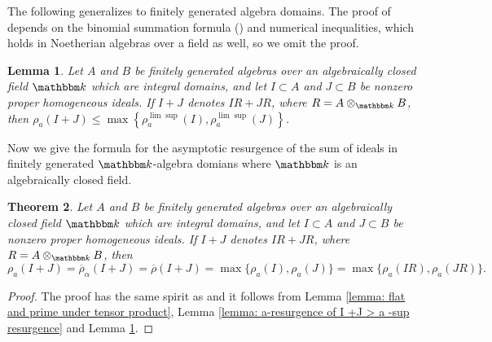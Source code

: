 \documentclass[12pt]{amsart}
\numberwithin{equation}{section}
\newtheorem{theorem}{Theorem}[section]
\newtheorem{lemma}[theorem]{Lemma}
\theoremstyle{definition}
\newcommand{\kk}{{\mathbbm k}}
\begin{document}
The following generalizes \cite[Lemma 2.5]{fiberprojective} to finitely generated algebra domains.  The proof of  \cite[Lemma 2.5]{fiberprojective} depends on the binomial summation formula (\cite[Theorem 3.4]{bionomial}) and numerical inequalities, which holds in Noetherian algebras over a field as well, so we omit the proof. 

\begin{lemma}\label{lemma: a-resurgence of I+J < a sup resurgence}
Let $A$ and $B$ be finitely generated algebras over an algebraically closed field $\kk$ which are integral domains, and let $I \subset A$ and $J \subset B$ be nonzero proper homogeneous ideals.  If $I + J$  denotes $IR+JR$, where $R=A\otimes_\kk B$, then   $\rho_a(I+J)\leqslant \max\left\{\rho_a^{\lim \sup }(I ), \rho_a^{\lim \sup }(J) \right\} $. 
\end{lemma}


	
Now we give the formula for the asymptotic resurgence of the sum of ideals in finitely generated $\kk$-algebra domians where $\kk$ is an algebraically closed field. 

\begin{theorem}\label{theorem: asymptotic resurgence of sum of ideals}
		Let $A$ and $B$ be finitely generated algebras over an algebraically closed field $\kk$ which are integral domains, and let $I \subset A$ and $J \subset B$ be nonzero proper homogeneous ideals.  If $I + J$  denotes $IR+JR$, where $R=A\otimes_\kk B$, then  
		$$	\rho_a(I + J) = \overline{\rho}_{\alpha}(I + J) = \overline{\rho}(I + J) = {\max}\{ \rho_a(I),  \rho_a(J) \}=\max\{\rho_a(IR),  \rho_a(JR)  \}.$$

	\end{theorem}
\begin{proof}
	The proof  has the same spirit as  \cite[Theorem 2.6]{fiberprojective} and it follows from  Lemma \ref{lemma: flat and prime under tensor product}, Lemma \ref{lemma: a-resurgence of  I +J > a -sup resurgence} and Lemma \ref{lemma: a-resurgence of I+J < a sup resurgence}. 
\end{proof}	
 
\end{document}

